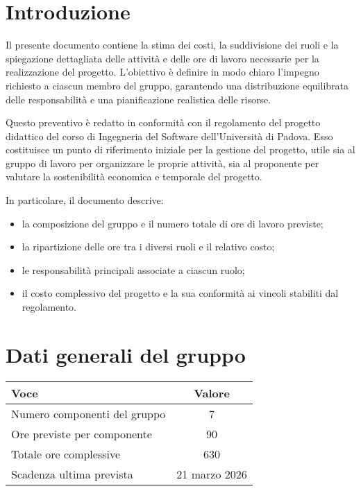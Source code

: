 \documentclass[a4paper, 11pt, oneside]{scrartcl} %
\begin{document}
\newpage
\section{Introduzione}

Il presente documento contiene la stima dei costi, la suddivisione dei ruoli e la spiegazione dettagliata delle attività e delle ore di lavoro necessarie per la realizzazione del progetto.  
L’obiettivo è definire in modo chiaro l’impegno richiesto a ciascun membro del gruppo, garantendo una distribuzione equilibrata delle responsabilità e una pianificazione realistica delle risorse.

Questo preventivo è redatto in conformità con il regolamento del progetto didattico del corso di Ingegneria del Software dell’Università di Padova.  
Esso costituisce un punto di riferimento iniziale per la gestione del progetto, utile sia al gruppo di lavoro per organizzare le proprie attività, sia al proponente per valutare la sostenibilità economica e temporale del progetto.

In particolare, il documento descrive:
\begin{itemize}
    \item la composizione del gruppo e il numero totale di ore di lavoro previste;
    \item la ripartizione delle ore tra i diversi ruoli e il relativo costo;
    \item le responsabilità principali associate a ciascun ruolo;
    \item il costo complessivo del progetto e la sua conformità ai vincoli stabiliti dal regolamento.
\end{itemize}

\section{Dati generali del gruppo}

\begin{center}
\begin{tabular}{|l|c|}
\hline
\textbf{Voce} & \textbf{Valore} \\
\hline
Numero componenti del gruppo & 7 \\
Ore previste per componente & 90 \\
Totale ore complessive & 630 \\
Scadenza ultima prevista & 21 marzo 2026 \\
\hline
\end{tabular}
\end{center}
\end{document}
